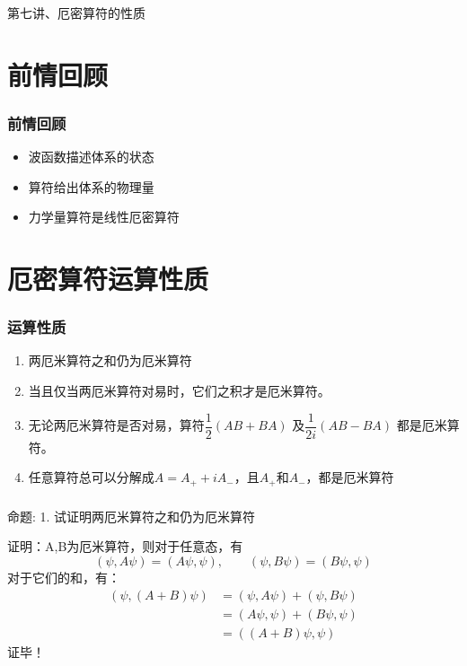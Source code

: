 \begin{frame}
    \frametitle{}
    \begin{center}
    { {\huge 第七讲、厄密算符的性质}}
    \end{center}    
\end{frame}


\section{前情回顾}

\begin{frame}
    \frametitle{前情回顾}
    \begin{itemize}
        \item 波函数描述体系的状态
        \item 算符给出体系的物理量
        \item 力学量算符是线性厄密算符
    \end{itemize}
\end{frame} 

\section{厄密算符运算性质}

\begin{frame}
    \frametitle{运算性质}
    \begin{enumerate}
        \item 两厄米算符之和仍为厄米算符
        \item 当且仅当两厄米算符对易时，它们之积才是厄米算符。
        \item 无论两厄米算符是否对易，算符$\dfrac{1}{2}(AB+BA)$ 及$\dfrac{1}{2i}(AB-BA) $  都是厄米算符。
        \item 任意算符总可以分解成$A=A_+ +iA_-$，且$A_+$和$A_-$，都是厄米算符
    \end{enumerate}
\end{frame} 

\begin{frame} [allowframebreaks=]
    \frametitle{}
    \begin{tcolorbox1}{命题:}
    1. 试证明两厄米算符之和仍为厄米算符 
    \end{tcolorbox1}
    \alert{证明：}A,B为厄米算符，则对于任意态，有\\
    $$(\psi, A\psi ) = (A\psi, \psi), \qquad (\psi, B\psi ) = (B\psi, \psi)$$
    对于它们的和，有： \\
    \begin{equation*}
        \begin{split}
            (\psi, (A+B)\psi ) &= (\psi, A\psi ) + (\psi, B\psi ) \\  
            &=(A\psi, \psi ) + (B\psi, \psi ) \\
            &=((A+B)\psi, \psi ) 
         \end{split}
    \end{equation*}  
    证毕！
\end{frame} 

